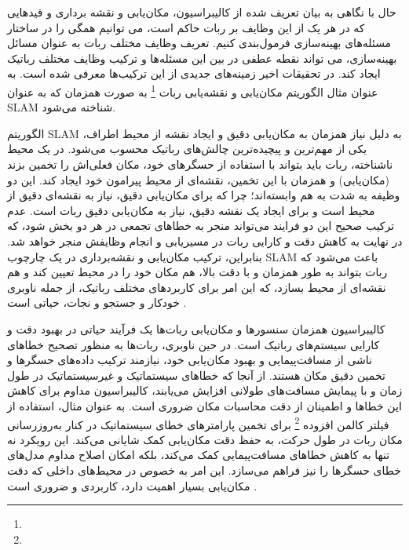حال با نگاهی به بیان تعریف شده از کالیبراسیون، مکان‌یابی و نقشه برداری و قید‌هایی که در هر یک از این وظایف بر ربات حاکم است، می توانیم همگی را در ساختار مسئله‌های بهینه‌سازی فرمول‌بندی کنیم. تعریف وظایف مختلف ربات به عنوان مسائل بهینه‌سازی، می تواند نقطه عطفی در بین این مسئله‌ها و ترکیب وظایف مختلف رباتیک ایجاد کند. در تحقیقات اخیر زمینه‌های جدیدی از این ترکیب‌ها معرفی شده است. به عنوان مثال الگوریتم مکان‌یابی و نقشه‌یابی ربات 
\footnote{}
به صورت همزمان که به عنوان SLAM شناخته می‌شود. 

الگوریتم SLAM به دلیل نیاز همزمان به مکان‌یابی دقیق و ایجاد نقشه از محیط اطراف، یکی از مهم‌ترین و پیچیده‌ترین چالش‌های رباتیک محسوب می‌شود. در یک محیط ناشناخته، ربات باید بتواند با استفاده از حسگرهای خود، مکان فعلی‌اش را تخمین بزند (مکان‌یابی) و همزمان با این تخمین، نقشه‌ای از محیط پیرامون خود ایجاد کند. این دو وظیفه به شدت به هم وابسته‌اند؛ چرا که برای مکان‌یابی دقیق، نیاز به نقشه‌ای دقیق از محیط است و برای ایجاد یک نقشه دقیق، نیاز به مکان‌یابی دقیق ربات است. عدم ترکیب صحیح این دو فرایند می‌تواند منجر به خطاهای تجمعی در هر دو بخش شود، که در نهایت به کاهش دقت و کارایی ربات در مسیریابی و انجام وظایفش منجر خواهد شد. بنابراین، ترکیب مکان‌یابی و نقشه‌برداری در یک چارچوب SLAM باعث می‌شود که ربات بتواند به طور همزمان و با دقت بالا، هم مکان خود را در محیط تعیین کند و هم نقشه‌ای از محیط بسازد، که این امر برای کاربردهای مختلف رباتیک، از جمله ناوبری خودکار و جستجو و نجات، حیاتی است
\cite{grisetti2010tutorial}.

کالیبراسیون همزمان سنسورها و مکان‌یابی ربات‌ها یک فرآیند حیاتی در بهبود دقت و کارایی سیستم‌های رباتیک است. در حین ناوبری، ربات‌ها به منظور تصحیح خطاهای ناشی از مسافت‌پیمایی و بهبود مکان‌یابی خود، نیازمند ترکیب داده‌های حسگرها و تخمین دقیق مکان هستند. از آنجا که خطاهای سیستماتیک و غیرسیستماتیک در طول زمان و با پیمایش مسافت‌های طولانی افزایش می‌یابند، کالیبراسیون مداوم برای کاهش این خطاها و اطمینان از دقت محاسبات مکان ضروری است. به عنوان مثال، استفاده از فیلتر کالمن افزوده 
\footnote{}
برای تخمین پارامترهای خطای سیستماتیک در کنار به‌روزرسانی مکان ربات در طول حرکت، به حفظ دقت مکان‌یابی کمک شایانی می‌کند. این رویکرد نه تنها به کاهش خطاهای مسافت‌پیمایی کمک می‌کند، بلکه امکان اصلاح مداوم مدل‌های خطای حسگرها را نیز فراهم می‌سازد. این امر به خصوص در محیط‌های داخلی که دقت مکان‌یابی بسیار اهمیت دارد، کاربردی و ضروری است
\cite{martinelli2007simultaneous}.

